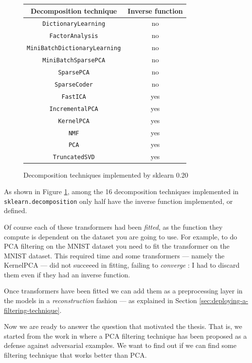 \begin{figure}
  \centering
  \begin{tabular}{|c|c|}
    \hline
    Decomposition technique & Inverse function\\
    \hline
    \texttt{DictionaryLearning} & no \\
    \hline
    \texttt{FactorAnalysis} & no \\
    \hline
    \texttt{MiniBatchDictionaryLearning} & no \\
    \hline
    \texttt{MiniBatchSparsePCA} & no \\
    \hline
    \texttt{SparsePCA} & no \\
    \hline
    \texttt{SparseCoder} & no \\
    \hline
    \texttt{FastICA} & yes \\
    \hline
    \texttt{IncrementalPCA} & yes \\
    \hline
    \texttt{KernelPCA} & yes \\
    \hline
    \texttt{NMF} & yes \\
    \hline
    \texttt{PCA} & yes \\
    \hline
    \texttt{TruncatedSVD} & yes \\
    \hline
  \end{tabular}
  \caption{Decomposition techniques implemented by sklearn 0.20}
  \label{fig:decomposition-techniques}
\end{figure}

As shown in Figure \ref{fig:decomposition-techniques}, among the 16
decomposition techniques implemented in \texttt{sklearn.\-decomposition}
only half have the inverse function implemented, or defined.

Of course each of these transformers had been \emph{fitted}, as the
function they compute is dependent on the dataset you are going to use.
For example, to do PCA filtering on the MNIST dataset you need to fit
the transformer on the MNIST dataset. This required time and some
transformers --- namely the KernelPCA --- did not succeeed in fitting,
failing to \emph{converge} : I had to discard them even if they had an
inverse function.

Once transformers have been fitted we can add them as a preprocessing
layer in the models in a \emph{reconstruction} fashion --- as explained
in Section \ref{sec:deploying-a-filtering-technique}.

Now we are ready to answer the question that motivated the thesis. That
is, we started from the work in \cite{bhagoji2018enhancing} where a PCA
filtering technique has been proposed as a defense against adversarial
examples. We want to find out if we can find some filtering technique
that works better than PCA.

